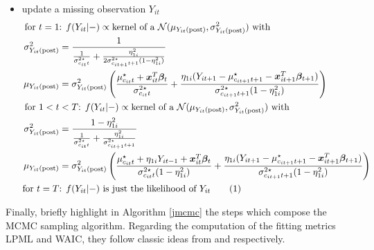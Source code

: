\documentclass[12pt,	%
	a4paper,		%
	twoside,		%
	openright,		%
	titlepage,%
	]{book}
\newcommand\numberthis{\addtocounter{equation}{1}\tag{\theequation}}
\theoremstyle{definition}
\begin{document}
\begin{itemize}
\item update a missing observation $Y_{it}$
\begin{align*}
\text{for }t=1 &\text{: }
  f(Y_{it}|-)\propto \text{kernel of a $\N(\mu_{\postp{Y_{it}}},\sigma^2_{\postp{Y_{it}}})$ with}\\
\sigma^2_{\postp{Y_{it}}}&= \frac{1}{\frac{1}{\sigma^{2\star}_{c_{it}t}} + \frac{\eta_{1i}^2}{2\sigma^{2\star}_{c_{it+1}t+1}(1-\eta_{1i}^2)}}\\
\mu_{\postp{Y_{it}}}&=  \sigma^2_{\postp{Y_{it}}} \left( \frac{\mu^\star_{c_{it}t} + \vec{x}_{it}^T\vec{\beta}_t}{\sigma^{2\star}_{c_{it}t}} + \frac{\eta_{1i}(Y_{it+1}-\mu^\star_{c_{it+1}t+1} - \vec{x}_{it+1}^T\vec{\beta}_{t+1})}{\sigma^{2\star}_{c_{it+1}t+1}(1-\eta_{1i}^2)} \right)\\
\text{for } 1<t&<T \text{: }
  f(Y_{it}|-)\propto \text{kernel of a $\N(\mu_{\postp{Y_{it}}},\sigma^2_{\postp{Y_{it}}})$ with}\\
\sigma^2_{\postp{Y_{it}}}&= \frac{1-\eta_{1i}^2}{\frac{1}{\sigma^{2\star}_{c_{it}t}} + \frac{\eta_{1i}^2}{\sigma^{2\star}_{c_{it+1}t+1}}}\\
\mu_{\postp{Y_{it}}}&=  \sigma^2_{\postp{Y_{it}}} \left( \frac{\mu^\star_{c_{it}t} + \eta_{1i}Y_{it-1} 
 + \vec{x}_{it}^T\vec{\beta}_t}{\sigma^{2\star}_{c_{it}t}(1-\eta_{1i}^2)} + \frac{\eta_{1i}(Y_{it+1}-\mu^\star_{c_{it+1}t+1} - \vec{x}_{it+1}^T\vec{\beta}_{t+1})}{\sigma^{2\star}_{c_{it+1}t+1}(1-\eta_{1i}^2)} \right)\\
\text{for } t=T & \text{: }
    f(Y_{it}|-)\text{ is just the likelihood of $Y_{it}$}
\numberthis \label{update yit}
\end{align*}


\end{itemize}

Finally, briefly highlight in Algorithm \ref{jmcmc} the steps which compose the MCMC sampling algorithm. Regarding the computation of the fitting metrics LPML and WAIC, they follow classic ideas from \cite{paper-20} and \cite{paper-21} respectively.
\end{document}
